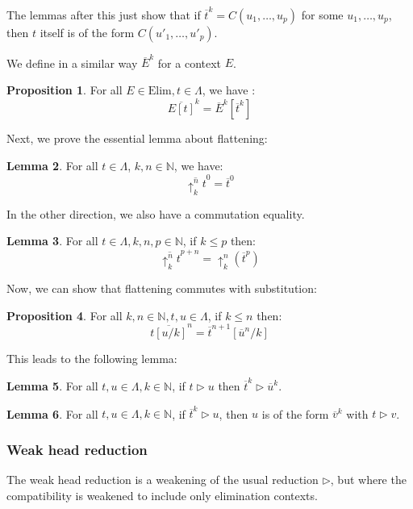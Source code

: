 \documentclass{article}
\newcommand{\bN}[0]{\mathbb N}
\newcommand{\lift}[2]{\uparrow_{#1}^{#2}}
\newcommand{\Elim}[0]{\mathrm{Elim}}
\newcommand{\flatten}[2]{\overline{#1}^{#2}}
\theoremstyle{definition}
\newtheorem{prop}{Proposition}[subsection]
\newtheorem{lem}[prop]{Lemma}
\begin{document}
The lemmas after this just show that if $\flatten t k = C(u_1,\ldots,u_p)$ for some $u_1,\ldots,u_p$, then
$t$ itself is of the form $C(u'_1,\ldots,u'_p)$.

We define in a similar way $\flatten E k$ for a context $E$.

\begin{prop}
    For all $E\in\Elim, t\in\Lambda$, we have :
    $$\flatten{E[t]} k = \flatten E k [\flatten t k]$$
\end{prop}

Next, we prove the essential lemma about flattening:

\begin{lem}
    For all $t\in\Lambda$, $k,n\in\bN$, we have:
    $$\flatten {\lift k n t} 0 = \flatten t 0$$
\end{lem}

In the other direction, we also have a commutation equality.

\begin{lem}
    For all $t\in\Lambda, k,n,p\in\bN$, if $k \leq p$ then:
    $$\flatten {\lift k n t} {p + n} = \lift k n (\flatten t p)$$
\end{lem}

Now, we can show that flattening commutes with substitution:

\begin{prop}
    For all $k,n\in\bN,t,u\in\Lambda$, if $k \leq n$ then:
    $$\flatten {t[u/k]} n = \flatten t {n + 1}[\flatten u n / k]$$
\end{prop}

This leads to the following lemma:

\begin{lem}
    For all $t,u\in\Lambda, k\in\bN$, if $t\rhd u$ then $\flatten t k \rhd \flatten u k$.
\end{lem}

\begin{lem}
    For all $t,u \in\Lambda, k \in \bN$, if $\flatten t k \rhd u$, then $u$ is of the form $\flatten v k$
    with $t\rhd v$.
\end{lem}

\subsubsection{Weak head reduction}

The weak head reduction is a weakening of the usual reduction $\rhd$, but where the compatibility is weakened
to include only elimination contexts.
\end{document}
